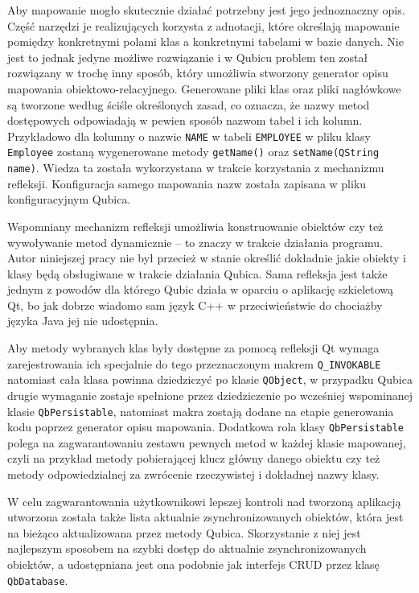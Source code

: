 \documentclass[12pt]{report}
\begin{document}
Aby mapowanie mogło skutecznie działać potrzebny jest jego jednoznaczny opis. Część narzędzi je realizujących korzysta z adnotacji, które określają mapowanie pomiędzy
konkretnymi polami klas a konkretnymi tabelami w bazie danych. Nie jest to jednak jedyne możliwe rozwiązanie i w Qubicu problem ten został rozwiązany w trochę inny sposób,
który umożliwia stworzony generator opisu mapowania obiektowo-relacyjnego. Generowane pliki klas oraz pliki nagłówkowe są tworzone według ściśle określonych zasad, 
co oznacza, że nazwy metod dostępowych odpowiadają w pewien sposób nazwom tabel i ich kolumn. Przykładowo dla kolumny o nazwie {\tt NAME} w tabeli {\tt EMPLOYEE} 
w pliku klasy {\tt Employee} zostaną wygenerowane metody {\tt getName()} oraz {\tt setName(QString name)}. Wie\-dza ta została wykorzystana w trakcie korzystania z 
mechanizmu refleksji. Konfiguracja samego mapowania nazw została zapisana w pliku konfiguracyjnym Qubica.

Wspomniany mechanizm refleksji umożliwia konstruowanie obiektów czy też wywoływanie metod dynamicznie -- to znaczy w trakcie działania programu. Autor niniejszej pracy 
nie był przecież w stanie określić dokładnie jakie obiekty i klasy będą obsługiwane w trakcie działania Qubica. Sama refleksja jest także jednym z powodów dla którego Qubic działa
w oparciu o aplikację szkieletową Qt, bo jak dobrze wiadomo sam język C++ w przeciwieństwie do chociażby języka Java jej nie udostępnia.

Aby metody wybranych klas były dostępne za pomocą refleksji Qt wymaga zarejestrowania ich specjalnie do tego przeznaczonym makrem {\tt Q\_INVOKABLE} natomiast cała klasa
powinna dziedziczyć po klasie {\tt QObject}, w przypadku Qubica drugie wymaganie zostaje spełnione przez dziedziczenie po wcześniej wspominanej klasie {\tt QbPersistable}, natomiast
makra zostają dodane na etapie generowania kodu poprzez generator opisu mapowania. Dodatkowa rola klasy {\tt QbPersistable} polega na zagwarantowaniu zestawu pewnych metod
w każdej klasie mapowanej, czyli na przykład metody pobierającej klucz główny danego obiektu czy też metody odpowiedzialnej za zwrócenie rzeczywistej i dokładnej nazwy klasy.

W celu zagwarantowania użytkownikowi lepszej kontroli nad tworzoną aplikacją utworzona została także lista aktualnie zsynchronizowanych obiektów, która jest na bieżąco aktualizowana
przez metody Qubica. Skorzystanie z niej jest najlepszym sposobem na szybki dostęp do aktualnie zsynchronizowanych obiektów, a udostępniana jest ona podobnie jak interfejs CRUD
przez klasę {\tt QbDatabase}.
\end{document}
